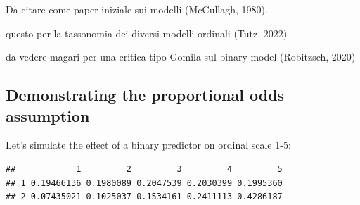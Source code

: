 \documentclass[
  man,floatsintext]{apa6}
\newenvironment{Shaded}{\begin{snugshade}}{\end{snugshade}}
\newcommand{\AttributeTok}[1]{\textcolor[rgb]{0.13,0.29,0.53}{#1}}
\newcommand{\CommentTok}[1]{\textcolor[rgb]{0.56,0.35,0.01}{\textit{#1}}}
\newcommand{\DecValTok}[1]{\textcolor[rgb]{0.00,0.00,0.81}{#1}}
\newcommand{\FloatTok}[1]{\textcolor[rgb]{0.00,0.00,0.81}{#1}}
\newcommand{\FunctionTok}[1]{\textcolor[rgb]{0.13,0.29,0.53}{\textbf{#1}}}
\newcommand{\NormalTok}[1]{#1}
\newcommand{\OtherTok}[1]{\textcolor[rgb]{0.56,0.35,0.01}{#1}}
\newcommand{\SpecialCharTok}[1]{\textcolor[rgb]{0.81,0.36,0.00}{\textbf{#1}}}
\newcommand{\StringTok}[1]{\textcolor[rgb]{0.31,0.60,0.02}{#1}}
\begin{document}
Da citare come paper iniziale sui modelli (McCullagh, 1980).

questo per la tassonomia dei diversi modelli ordinali (Tutz, 2022)

da vedere magari per una critica tipo Gomila sul binary model (Robitzsch, 2020)

\subsection{Demonstrating the proportional odds assumption}\label{demonstrating-the-proportional-odds-assumption}

Let's simulate the effect of a binary predictor on ordinal scale 1-5:

\begin{Shaded}
\end{Shaded}

\begin{verbatim}
##            1         2         3         4         5
## 1 0.19466136 0.1980089 0.2047539 0.2030399 0.1995360
## 2 0.07435021 0.1025037 0.1534161 0.2411113 0.4286187
\end{verbatim}
\end{document}
